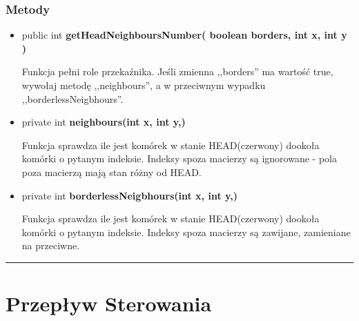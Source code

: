 \documentclass[a4paper,11pt]{article}
\newcommand{\linia}{\rule{\linewidth}{0.4mm}}
\begin{document}
\subsubsection{Metody}
\begin{itemize}
\item public int  \textbf{getHeadNeighboursNumber( boolean borders, int x, int y )}

Funkcja pełni role przekaźnika. Jeśli zmienna ,,borders'' ma wartość true, wywołaj metodę ,,neighbours'', a w przeciwnym wypadku ,,borderlessNeigbhours''.

\item private int  \textbf{neighbours(int x, int y,)}

Funkcja sprawdza ile jest komórek w stanie HEAD(czerwony) dookoła komórki o pytanym indeksie. Indeksy spoza macierzy są ignorowane - pola poza macierzą mają stan różny od HEAD.
\item private int  \textbf{borderlessNeigbhours(int x, int y,)}

Funkcja sprawdza ile jest komórek w stanie HEAD(czerwony) dookoła komórki o pytanym indeksie. Indeksy spoza macierzy są zawijane, zamieniane na przeciwne.
\end{itemize}

\noindent\linia
\section{Przepływ Sterowania}
\end{document}
